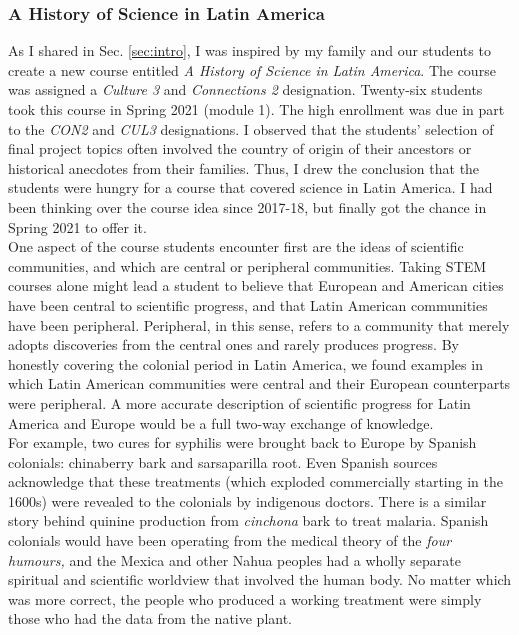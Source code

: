 \documentclass[../../../main.tex]{subfiles}
\begin{document}
\subsubsection{A History of Science in Latin America}

As I shared in Sec. \ref{sec:intro}, I was inspired by my family and our students to create a new course entitled \textit{A History of Science in Latin America}.  The course was assigned a \textit{Culture 3} and \textit{Connections 2} designation.  Twenty-six students took this course in Spring 2021 (module 1).  The high enrollment was due in part to the \textit{CON2} and \textit{CUL3} designations.  I observed that the students' selection of final project topics often involved the country of origin of their ancestors or historical anecdotes from their families.  Thus, I drew the conclusion that the students were hungry for a course that covered science in Latin America.  I had been thinking over the course idea since 2017-18, but finally got the chance in Spring 2021 to offer it.
\\
\vspace{0.25cm}
One aspect of the course students encounter first are the ideas of scientific communities, and which are central or peripheral communities. Taking STEM courses alone might lead a student to believe that European and American cities have been central to scientific progress, and that Latin American communities have been peripheral. Peripheral, in this sense, refers to a community that merely adopts discoveries from the central ones and rarely produces progress. By honestly covering the colonial period in Latin America, we found examples in which Latin American communities were central and their European counterparts were peripheral. A more accurate description of scientific progress for Latin America and Europe would be a full two-way exchange of knowledge.
\\
\vspace{0.25cm}
For example, two cures for syphilis were brought back to Europe by Spanish colonials: chinaberry bark and sarsaparilla root.  Even Spanish sources acknowledge that these treatments (which exploded commercially starting in the 1600s) were revealed to the colonials by indigenous doctors.  There is a similar story behind quinine production from \textit{cinchona} bark to treat malaria.  Spanish colonials would have been operating from the medical theory of the \textit{four humours,} and the Mexica and other Nahua peoples had a wholly separate spiritual and scientific worldview that involved the human body.  No matter which was more correct, the people who produced a working treatment were simply those who had the data from the native plant.
\end{document}
